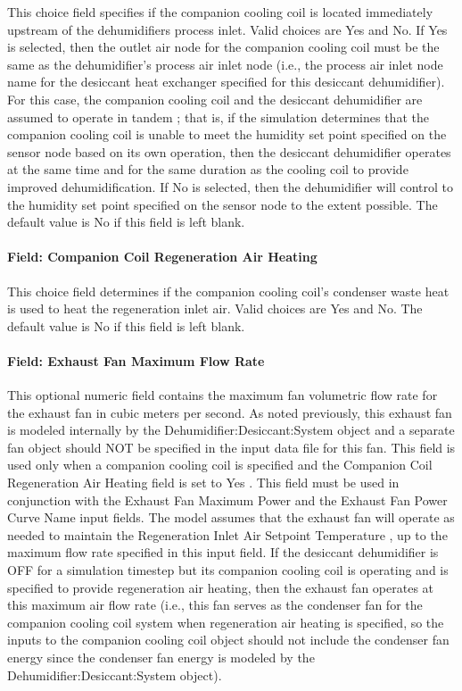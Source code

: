 This choice field specifies if the companion cooling coil is located immediately upstream of the dehumidifiers process inlet. Valid choices are Yes and No. If Yes is selected, then the outlet air node for the companion cooling coil must be the same as the dehumidifier's process air inlet node (i.e., the process air inlet node name for the desiccant heat exchanger specified for this desiccant dehumidifier). For this case, the companion cooling coil and the desiccant dehumidifier are assumed to operate in tandem ; that is, if the simulation determines that the companion cooling coil is unable to meet the humidity set point specified on the sensor node based on its own operation, then the desiccant dehumidifier operates at the same time and for the same duration as the cooling coil to provide improved dehumidification. If No is selected, then the dehumidifier will control to the humidity set point specified on the sensor node to the extent possible. The default value is No if this field is left blank.

\paragraph{Field: Companion Coil Regeneration Air Heating}\label{field-companion-coil-regeneration-air-heating}

This choice field determines if the companion cooling coil's condenser waste heat is used to heat the regeneration inlet air. Valid choices are Yes and No. The default value is No if this field is left blank.

\paragraph{Field: Exhaust Fan Maximum Flow Rate}\label{field-exhaust-fan-maximum-flow-rate}

This optional numeric field contains the maximum fan volumetric flow rate for the exhaust fan in cubic meters per second. As noted previously, this exhaust fan is modeled internally by the Dehumidifier:Desiccant:System object and a separate fan object should NOT be specified in the input data file for this fan. This field is used only when a companion cooling coil is specified and the Companion Coil Regeneration Air Heating field is set to Yes . This field must be used in conjunction with the Exhaust Fan Maximum Power and the Exhaust Fan Power Curve Name input fields. The model assumes that the exhaust fan will operate as needed to maintain the Regeneration Inlet Air Setpoint Temperature , up to the maximum flow rate specified in this input field. If the desiccant dehumidifier is OFF for a simulation timestep but its companion cooling coil is operating and is specified to provide regeneration air heating, then the exhaust fan operates at this maximum air flow rate (i.e., this fan serves as the condenser fan for the companion cooling coil system when regeneration air heating is specified, so the inputs to the companion cooling coil object should not include the condenser fan energy since the condenser fan energy is modeled by the Dehumidifier:Desiccant:System object).

